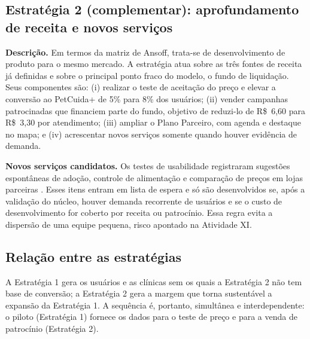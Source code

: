 \subsection{Estratégia 2 (complementar): aprofundamento de receita e novos serviços}

\textbf{Descrição.} Em termos da matriz de Ansoff, trata-se de desenvolvimento de produto para o mesmo mercado. A estratégia atua sobre as três fontes de receita já definidas e sobre o principal ponto fraco do modelo, o fundo de liquidação. Seus componentes são: (i) realizar o teste de aceitação do preço e elevar a conversão ao PetCuida+ de 5\% para 8\% dos usuários; (ii) vender campanhas patrocinadas que financiem parte do fundo, objetivo de reduzi-lo de R\$~6,60 para R\$~3,30 por atendimento; (iii) ampliar o Plano Parceiro, com agenda e destaque no mapa; e (iv) acrescentar novos serviços somente quando houver evidência de demanda.

\textbf{Novos serviços candidatos.} Os testes de usabilidade registraram sugestões espontâneas de adoção, controle de alimentação e comparação de preços em lojas parceiras \cite{grupo2026a6}. Esses itens entram em lista de espera e só são desenvolvidos se, após a validação do núcleo, houver demanda recorrente de usuários e se o custo de desenvolvimento for coberto por receita ou patrocínio. Essa regra evita a dispersão de uma equipe pequena, risco apontado na Atividade XI.

\subsection{Relação entre as estratégias}

A Estratégia 1 gera os usuários e as clínicas sem os quais a Estratégia 2 não tem base de conversão; a Estratégia 2 gera a margem que torna sustentável a expansão da Estratégia 1. A sequência é, portanto, simultânea e interdependente: o piloto (Estratégia 1) fornece os dados para o teste de preço e para a venda de patrocínio (Estratégia 2).
